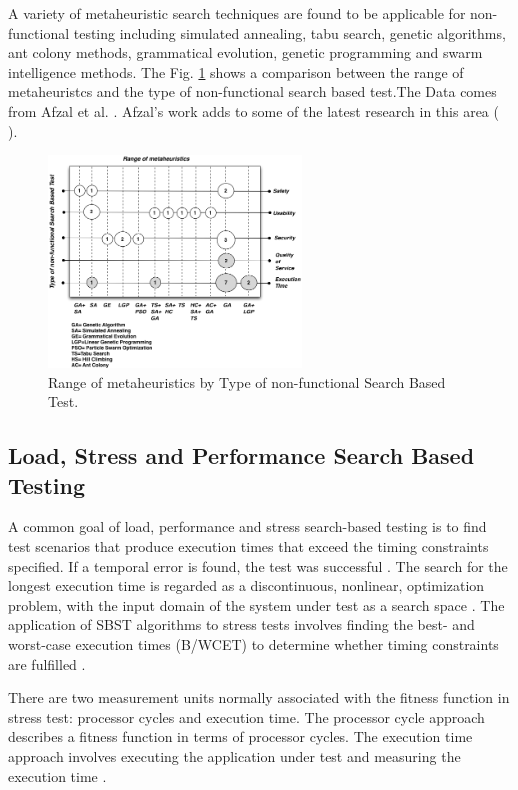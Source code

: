 \documentclass[times]{stvrauth}
\begin{document}
A variety of metaheuristic search techniques are found to be applicable for non-functional testing including simulated annealing, tabu search, genetic algorithms, ant colony methods, grammatical evolution, genetic programming and swarm intelligence methods. The Fig. \ref{fig:metabykind} shows a comparison between the range of metaheuristcs and the type of non-functional search based test.The Data comes from Afzal et al. \cite{Afzal2009}. Afzal's work adds to some of the latest research in this area (\cite{Garousi2006} \cite{Garousi2010} \cite{DiAlesio2013} \cite{DiAlesio2014} \cite{Alesio2015} \cite{Gois2016}). 


\begin{figure}[h]
\centering
\includegraphics[width=0.6\textwidth]{./images/metaheuristics.png}
\caption{Range of metaheuristics by Type of non-functional Search Based Test\cite{Afzal2009a}. }
\label{fig:metabykind}
\end{figure}

\subsection{Load, Stress and Performance Search Based Testing}

A common goal of load, performance and stress search-based testing is to find test scenarios that produce execution times that exceed the timing constraints specified. If a temporal error is found, the test was successful \cite{Sullivan}. The search for the longest execution time is regarded as a discontinuous, nonlinear, optimization problem, with the input domain of the system under test as a search space \cite{Sullivan}.  The application of SBST algorithms to  stress tests involves finding the best- and worst-case execution times (B/WCET) to determine whether timing constraints are fulfilled \cite{Afzal2009a}. 

There are two measurement units normally associated with the fitness function in stress test: processor cycles and execution time. The processor cycle approach describes a fitness function in terms of processor cycles. The execution time approach involves executing the application under test and measuring the execution time \cite{Afzal2009a} \cite{tracey2000search}.
\end{document}

